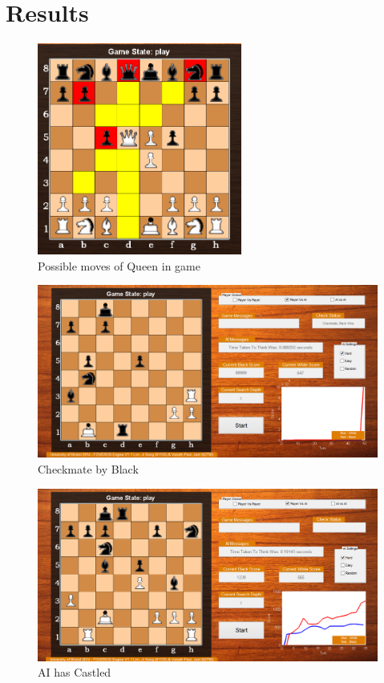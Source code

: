 \documentclass[11pt,a4paper]{article}
\begin{document}
\newpage
\section{Results}
\begin{figure}[H]
\centering
\includegraphics[width=0.6\textwidth]{Queen}
\caption{Possible moves of Queen in game}
\label{fig:chess1}
\end{figure}

\begin{figure}[H]
\centering
\includegraphics[width=1\textwidth]{black_checkmate}
\caption{Checkmate by Black}
\label{fig:chess1}
\end{figure}

\begin{figure}[H]
\centering
\includegraphics[width=1\textwidth]{AI_castling}
\caption{AI has Castled}
\label{fig:chess1}
\end{figure}
\end{document}
